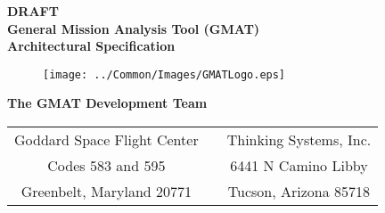 \thispagestyle{empty}
\begin{center}
{\renewcommand{\thefootnote}{\fnsymbol{footnote}} { \huge \bf DRAFT
\\General Mission Analysis Tool (GMAT)\\ Architectural Specification\\}
\vspace{0.1in} }
\end{center}

\begin{figure}[htbp!]
    \begin{center}
    \texttt{[image: ../Common/Images/GMATLogo.eps]}
    \end{center}
\end{figure}

\begin{center}
{\Large \bf The GMAT Development Team}\\
\vspace{0.1in}
\begin{tabular}{c c c}
  Goddard Space Flight Center & & Thinking Systems, Inc. \\
  Codes 583 and 595 & \hspace{0.3in} & 6441 N Camino Libby \\
  Greenbelt, Maryland 20771 & & Tucson, Arizona 85718 \\
\end{tabular}

\vspace{0.1in}{\today}

\end{center}

\clearpage \clearpage

